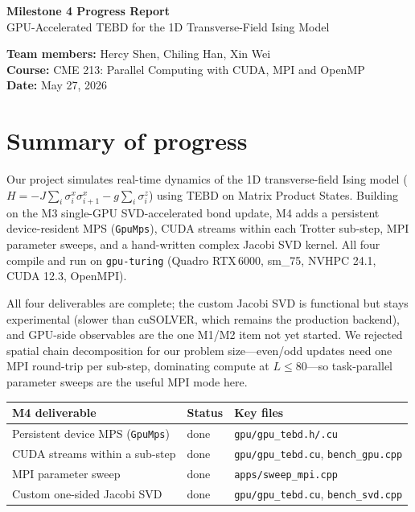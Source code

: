 \documentclass[11pt]{article}
\newcommand{\code}[1]{\texttt{#1}}
\begin{document}
\begin{center}
{\Large\bfseries Milestone 4 Progress Report}\\[2pt]
GPU-Accelerated TEBD for the 1D Transverse-Field Ising Model
\end{center}

\textbf{Team members:} Hercy Shen, Chiling Han, Xin Wei\\
\textbf{Course:} CME 213: Parallel Computing with CUDA, MPI and OpenMP\\
\textbf{Date:} May 27, 2026

\section{Summary of progress}

Our project simulates real-time dynamics of the 1D transverse-field Ising
model ($H{=}{-}J\sum_i\sigma_i^x\sigma_{i+1}^x{-}g\sum_i\sigma_i^z$)
using TEBD on Matrix Product States.  Building on the M3 single-GPU
SVD-accelerated bond update, M4 adds a persistent device-resident MPS
(\code{GpuMps}), CUDA streams within each Trotter sub-step, MPI parameter
sweeps, and a hand-written complex Jacobi SVD kernel.  All four compile and
run on \code{gpu-turing} (Quadro RTX\,6000, sm\_75, NVHPC 24.1, CUDA 12.3,
OpenMPI).

All four deliverables are complete; the custom Jacobi SVD is functional but
stays experimental (slower than cuSOLVER, which remains the production
backend), and GPU-side observables are the one M1/M2 item not yet started.
We rejected spatial chain decomposition for our problem size---even/odd
updates need one MPI round-trip per sub-step, dominating compute at
$L\le80$---so task-parallel parameter sweeps are the useful MPI mode here.

\begin{table}[h]
\centering\small
\begin{tabular}{lll}
\toprule
\textbf{M4 deliverable} & \textbf{Status} & \textbf{Key files} \\
\midrule
Persistent device MPS (\code{GpuMps}) & done & \code{gpu/gpu\_tebd.h/.cu} \\
CUDA streams within a sub-step & done & \code{gpu/gpu\_tebd.cu}, \code{bench\_gpu.cpp} \\
MPI parameter sweep & done & \code{apps/sweep\_mpi.cpp} \\
Custom one-sided Jacobi SVD & done & \code{gpu/gpu\_tebd.cu}, \code{bench\_svd.cpp} \\
\bottomrule
\end{tabular}
\end{table}
\end{document}
